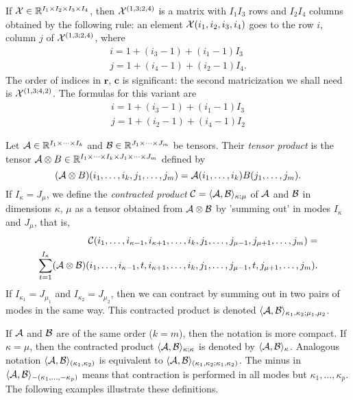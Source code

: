 If $\mathcal{X} \in \mathbb{R}^{I_1 \times I_2 \times I_3 \times I_4}$, then $\mathcal{X}^{(1,3;2,4)}$ is a 
matrix with $I_1 I_3$ rows and $I_2 I_4$ columns obtained by the following rule:
an element $\mathcal{X}(i_1, i_2, i_3, i_4)$ goes to the row $i$, column $j$ of $\mathcal{X}^{(1,3;2,4)}$,
where 
\begin{eqnarray}
i = 1 + (i_3 - 1) + (i_1 -1) I_3 \\
j = 1 + (i_4 - 1) + (i_2 -1) I_4.
\end{eqnarray}
The order of indices in $\mathbf{r}$, $\mathbf{c}$ is significant: the second matricization
we shall need is $\mathcal{X}^{(1,3;4,2)}$. The formulas for this variant are
\begin{eqnarray}
i = 1 + (i_3 - 1) + (i_1 -1) I_3 \\
j = 1 + (i_2 - 1) + (i_4 -1) I_2 
\end{eqnarray}



Let $\mathcal{A} \in \mathbb{R}^{I_1 \times \cdots \times I_k} $ and $\mathcal{B}  \in \mathbb{R}^{J_1 \times \cdots \times J_m}$ be tensors.
Their \textit{tensor product} is the tensor $ \mathcal{A} \otimes B  \in {\mathbb{R}}^{I_1 \times \cdots \times I_k \times J_1 \times \cdots \times J_m } $
defined by
\begin{equation}
    (\mathcal{A} \otimes B)(i_1, \dots, i_k, j_1, \dots, j_m) = \mathcal{A}(i_1, \dots, i_k) B(j_1, \dots, j_m).
\end{equation}
If $I_{\kappa} = J_{\mu}$, we define the \textit{contracted product} $\mathcal{C} = \langle \mathcal{A}, \mathcal{B} \rangle_{\kappa; \mu} $ of $\mathcal{A}$ and $\mathcal{B}$ in dimensions $\kappa$, $\mu$ as a tensor
obtained from $\mathcal{A} \otimes \mathcal{B}$ by 'summing out' in modes $I_{\kappa}$ and $J_{\mu}$, that is,
\begin{eqnarray}
    \mathcal{C}(i_1, \dots, i_{\kappa-1}, i_{\kappa + 1} , \dots, i_{k}, j_1, \dots, j_{\mu - 1}, j_{\mu+1}, \dots, j_{m}) = \notag\\
    \sum_{t = 1}^{I_{\kappa}} (\mathcal{A} \otimes \mathcal{B})(i_1, \dots, i_{\kappa-1}, t, i_{\kappa+1}, \dots,  i_k, j_1, \dots, j_{\mu-1}, t, j_{\mu+1}, \dots, j_m).
\end{eqnarray}
If $I_{\kappa_1} = J_{\mu_1}$ and $I_{\kappa_2} = J_{\mu_2}$, then we can contract
by summing out in two pairs of modes in the same way. This contracted product is 
denoted $\langle \mathcal{A}, \mathcal{B} \rangle_{\kappa_1, \kappa_2; \mu_1, \mu_2}$.



If $\mathcal{A}$ and $\mathcal{B}$ are of the same order ($k = m$), then the notation is more compact.
If $\kappa = \mu$, then the contracted product
$\langle \mathcal{A}, \mathcal{B} \rangle_{\kappa; \kappa}$
is denoted by $\langle \mathcal{A}, \mathcal{B} \rangle_{\kappa}$. Analogous notation $\langle \mathcal{A}, \mathcal{B} \rangle_{(\kappa_1, \kappa_2)}$ is equivalent to $\langle \mathcal{A}, \mathcal{B} \rangle_{(\kappa_1, \kappa_2;\kappa_1, \kappa_2)}$.
The minus in $\langle \mathcal{A}, \mathcal{B} \rangle _{ -(\kappa_1, \dots, -\kappa_p)}$ means 
that contraction is performed in all modes but $\kappa_1, \dots, \kappa_p$. The following examples 
illustrate these definitions.


